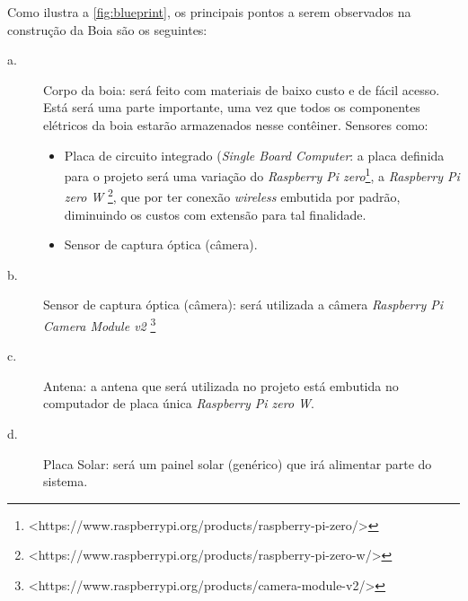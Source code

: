Como ilustra a \autoref{fig:blueprint}, os principais pontos a serem observados na construção da Boia são os seguintes:
\begin{description}
    \item[a.] Corpo da boia: será feito com materiais de baixo custo e de fácil acesso. Está será uma parte importante, uma vez que todos os componentes elétricos da boia estarão armazenados nesse contêiner. Sensores como:
    \begin{itemize}
        \item Placa de circuito integrado (\textit{Single Board Computer}: a placa definida para o projeto será uma variação do \textit{Raspberry Pi zero}\footnote{<https://www.raspberrypi.org/products/raspberry-pi-zero/>}, a \textit{Raspberry Pi zero W} \footnote{<https://www.raspberrypi.org/products/raspberry-pi-zero-w/>}, que por ter conexão \textit{wireless} embutida por padrão, diminuindo os custos com extensão para tal finalidade. 
        \item Sensor de captura óptica (câmera).
    \end{itemize}
    
    \item[b.] Sensor de captura óptica (câmera):  será utilizada a câmera \textit{Raspberry Pi Camera Module v2} \footnote{<https://www.raspberrypi.org/products/camera-module-v2/>}
    \item[c.] Antena: a antena que será utilizada no projeto está embutida no computador de placa única \textit{Raspberry Pi zero W}. 
    \item[d.] Placa Solar: será um painel solar (genérico) que irá alimentar parte do sistema.
\end{description}







